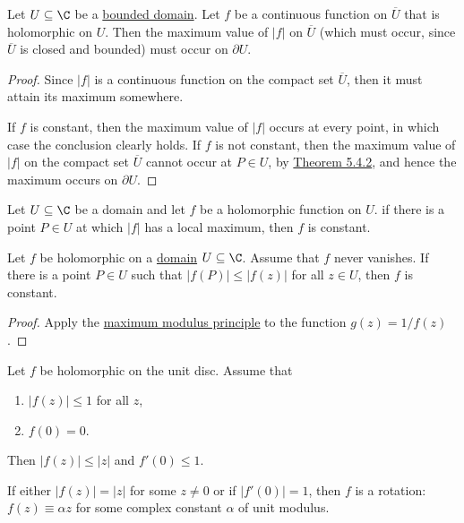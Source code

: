 \label{befe6f9}

Let $U\subseteq\C$ be a \href{f2be1bc}{bounded domain}. Let $f$ be a continuous
function on $\overline U$ that is holomorphic on $U$. Then the maximum value of
$|f|$ on $\overline U$ (which must occur, since $\overline U$ is closed and
bounded) must occur on $\partial U$.

\begin{proof}
  Since $|f|$ is a continuous function on the compact set $\overline U$, then it
  must attain its maximum somewhere.

  If $f$ is constant, then the maximum value of $|f|$ occurs at every point, in
  which case the conclusion clearly holds. If $f$ is not constant, then the
  maximum value of $|f|$ on the compact set $\overline U$ cannot occur at $P\in
  U$, by \href{bfc4e84}{Theorem 5.4.2}, and hence the maximum occurs on $\partial
  U$.
\end{proof}

\label{c3c0370}

Let $U\subseteq\C$ be a domain and let $f$ be a holomorphic function on $U$. if
there is a point $P\in U$ at which $|f|$ has a local maximum, then $f$ is
constant.

\label{dc80ded}

Let $f$ be holomorphic on a \href{f2be1bc}{domain} $U\subseteq\C$. Assume that
$f$ never vanishes. If there is a point $P\in U$ such that $|f(P)|\leq |f(z)|$
for all $z\in U$, then $f$ is constant.

\begin{proof}
  Apply the \href{bfc4e84}{maximum modulus principle} to the function
  $g(z)=1/f(z)$.
\end{proof}

\label{f0c9fe2}

Let $f$ be holomorphic on the unit disc. Assume that
\begin{enumerate}
  \item $|f(z)|\leq1$ for all $z$,
  \item $f(0)=0$.
\end{enumerate}

Then $|f(z)|\leq|z|$ and $f'(0)\leq1$.

If either $|f(z)|=|z|$ for some $z\neq0$ or if $|f'(0)|=1$, then $f$ is a
rotation: $f(z)\equiv\alpha z$ for some complex constant $\alpha$ of unit
modulus.

